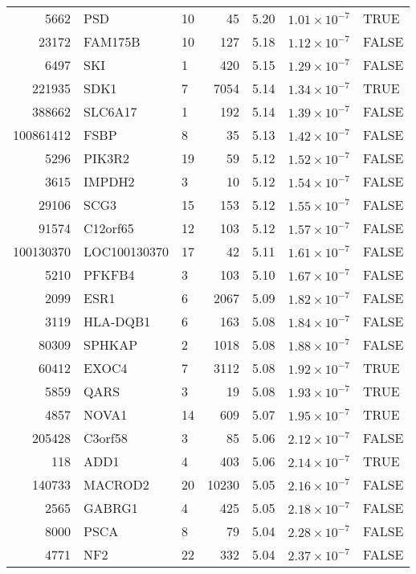 \begin{table}[ht]
\begin{adjustbox}{totalheight=10in}
\begin{tabular}{rllrrrl}
  5662 & PSD & 10 &  45 & 5.20 & $1.01 \times 10^{-7}$ & TRUE \\ 
  23172 & FAM175B & 10 & 127 & 5.18 & $1.12 \times 10^{-7}$ & FALSE \\ 
  6497 & SKI & 1 & 420 & 5.15 & $1.29 \times 10^{-7}$ & FALSE \\ 
  221935 & SDK1 & 7 & 7054 & 5.14 & $1.34 \times 10^{-7}$ & TRUE \\ 
  388662 & SLC6A17 & 1 & 192 & 5.14 & $1.39 \times 10^{-7}$ & FALSE \\ 
  100861412 & FSBP & 8 &  35 & 5.13 & $1.42 \times 10^{-7}$ & FALSE \\ 
  5296 & PIK3R2 & 19 &  59 & 5.12 & $1.52 \times 10^{-7}$ & FALSE \\ 
  3615 & IMPDH2 & 3 &  10 & 5.12 & $1.54 \times 10^{-7}$ & FALSE \\ 
  29106 & SCG3 & 15 & 153 & 5.12 & $1.55 \times 10^{-7}$ & FALSE \\ 
  91574 & C12orf65 & 12 & 103 & 5.12 & $1.57 \times 10^{-7}$ & FALSE \\ 
  100130370 & LOC100130370 & 17 &  42 & 5.11 & $1.61 \times 10^{-7}$ & FALSE \\ 
  5210 & PFKFB4 & 3 & 103 & 5.10 & $1.67 \times 10^{-7}$ & FALSE \\ 
  2099 & ESR1 & 6 & 2067 & 5.09 & $1.82 \times 10^{-7}$ & FALSE \\ 
  3119 & HLA-DQB1 & 6 & 163 & 5.08 & $1.84 \times 10^{-7}$ & FALSE \\ 
  80309 & SPHKAP & 2 & 1018 & 5.08 & $1.88 \times 10^{-7}$ & FALSE \\ 
  60412 & EXOC4 & 7 & 3112 & 5.08 & $1.92 \times 10^{-7}$ & TRUE \\ 
  5859 & QARS & 3 &  19 & 5.08 & $1.93 \times 10^{-7}$ & TRUE \\ 
  4857 & NOVA1 & 14 & 609 & 5.07 & $1.95 \times 10^{-7}$ & TRUE \\ 
  205428 & C3orf58 & 3 &  85 & 5.06 & $2.12 \times 10^{-7}$ & FALSE \\ 
  118 & ADD1 & 4 & 403 & 5.06 & $2.14 \times 10^{-7}$ & TRUE \\ 
  140733 & MACROD2 & 20 & 10230 & 5.05 & $2.16 \times 10^{-7}$ & FALSE \\ 
  2565 & GABRG1 & 4 & 425 & 5.05 & $2.18 \times 10^{-7}$ & FALSE \\ 
  8000 & PSCA & 8 &  79 & 5.04 & $2.28 \times 10^{-7}$ & FALSE \\ 
  4771 & NF2 & 22 & 332 & 5.04 & $2.37 \times 10^{-7}$ & FALSE \\ 

\end{tabular}
\end{adjustbox}
\end{table}
